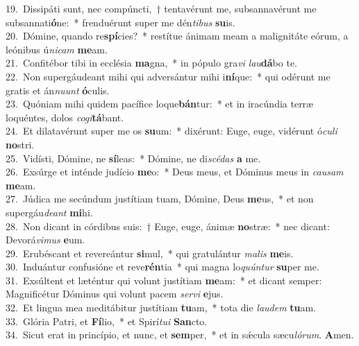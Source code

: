 {19.~}Dissipáti sunt, nec compúncti,~† tentavérunt me, subsannavérunt me subsannati\textbf{ó}ne:~* frenduérunt super me dén\textit{ti}\textit{bus} \textbf{su}is.\\
{20.~}Dómine, quando re\textbf{spí}cies?~* restítue ánimam meam a malignitáte eórum, a leónibus ú\textit{ni}\textit{cam} \textbf{me}am.\\
{21.~}Confitébor tibi in ecclésia \textbf{ma}gna,~* in pópulo gra\textit{vi} \textit{lau}\textbf{dá}bo te.\\
{22.~}Non supergáudeant mihi qui adversántur mihi i\textbf{ní}que:~* qui odérunt me gratis et án\textit{nu}\textit{unt} \textbf{ó}culis.\\
{23.~}Quóniam mihi quidem pacífice loque\textbf{bán}tur:~* et in iracúndia terræ loquéntes, dolos \textit{co}\textit{gi}\textbf{tá}bant.\\
{24.~}Et dilatavérunt super me os \textbf{su}um:~* dixérunt: Euge, euge, vidérunt ó\textit{cu}\textit{li} \textbf{no}stri.\\
{25.~}Vidísti, Dómine, ne \textbf{sí}leas:~* Dómine, ne di\textit{scé}\textit{das} \textbf{a} me.\\
{26.~}Exsúrge et inténde judício \textbf{me}o:~* Deus meus, et Dóminus meus in \textit{cau}\textit{sam} \textbf{me}am.\\
{27.~}Júdica me secúndum justítiam tuam, Dómine, Deus \textbf{me}us,~* et non supergáu\textit{de}\textit{ant} \textbf{mi}hi.\\
{28.~}Non dicant in córdibus suis:~† Euge, euge, ánimæ \textbf{no}stræ:~* nec dicant: Devorá\textit{vi}\textit{mus} \textbf{e}um.\\
{29.~}Erubéscant et revereántur \textbf{si}mul,~* qui gratulántur \textit{ma}\textit{lis} \textbf{me}is.\\
{30.~}Induántur confusióne et reve\textbf{rén}tia~* qui magna lo\textit{quún}\textit{tur} \textbf{su}per me.\\
{31.~}Exsúltent et læténtur qui volunt justítiam \textbf{me}am:~* et dicant semper: Magnificétur Dóminus qui volunt pacem \textit{ser}\textit{vi} \textbf{e}jus.\\
{32.~}Et lingua mea meditábitur justítiam \textbf{tu}am,~* tota die \textit{lau}\textit{dem} \textbf{tu}am.\\
{33.~}Glória Patri, et \textbf{Fí}lio,~* et Spirí\textit{tu}\textit{i} \textbf{San}cto.\\
{34.~}Sicut erat in princípio, et nunc, et \textbf{sem}per,~* et in sǽcula sæcu\textit{ló}\textit{rum}. \textbf{A}men.\\
